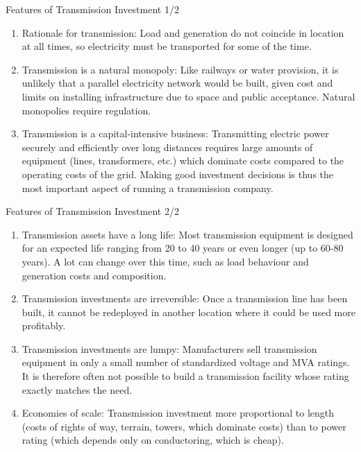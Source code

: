 \documentclass[10pt,aspectratio=169,dvipsnames]{beamer}
\let\olditem\item
\renewcommand{\item}{%
\olditem\vspace{5pt}}
\begin{document}
\begin{frame}{Features of Transmission Investment 1/2}


  \begin{enumerate}
  \item \alert{Rationale for transmission}: Load and generation do not coincide in location at all times, so electricity must be transported for some of the time.
  \item \alert{Transmission is a natural monopoly}: Like railways or water provision, it is unlikely that a parallel electricity network would be built, given cost and limits on installing infrastructure due to space and public acceptance. Natural monopolies require \alert{regulation}.
  \item \alert{Transmission is a capital-intensive business}:
    Transmitting electric power securely and efficiently over long
    distances requires large amounts of equipment (lines,
    transformers, etc.) which dominate costs compared to the operating
    costs of the grid. Making good investment decisions is thus the
    most important aspect of running a transmission company.
  \end{enumerate}



\end{frame}


\begin{frame}{Features of Transmission Investment 2/2}


  \begin{enumerate}
  \item \alert{Transmission assets have a long life}: Most
    transmission equipment is designed for an expected life ranging
    from 20 to 40 years or even longer (up to 60-80 years). A lot can
    change over this time, such as load behaviour and generation costs
    and composition.
  \item \alert{Transmission investments are irreversible}: Once a transmission line has been built, it
  cannot be redeployed in another location where it could be used more profitably.
  \item \alert{Transmission investments are lumpy}: Manufacturers sell transmission equipment in
    only a small number of standardized voltage and MVA ratings. It is therefore often not
    possible to build a transmission facility whose rating exactly matches the need.
    \item \alert{Economies of scale}: Transmission investment more
      proportional to length (costs of rights of way, terrain, towers,
      which dominate costs) than to power rating (which depends only
      on conductoring, which is cheap).

  \end{enumerate}


\end{frame}
\end{document}

